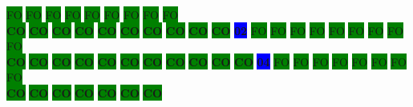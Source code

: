 \colorbox{green}{\color[gray]{0.75}FO}%
\colorbox{green}{\color[gray]{0.75}FO}%
\colorbox{green}{\color[gray]{0.75}FO}%
\colorbox{green}{\color[gray]{0.75}FO}%
\colorbox{green}{\color[gray]{0.75}FO}%
\colorbox{green}{\color[gray]{0.75}FO}%
\colorbox{green}{\color[gray]{0.75}FO}%
\colorbox{green}{\color[gray]{0.75}FO}%
\colorbox{green}{\color[gray]{0.75}FO}%
\\
\colorbox{green}{\color[rgb]{0,0,0}\textbf{CO}}%
\colorbox{green}{\color[rgb]{0,0,0}\textbf{CO}}%
\colorbox{green}{\color[rgb]{0,0,0}\textbf{CO}}%
\colorbox{green}{\color[rgb]{0,0,0}\textbf{CO}}%
\colorbox{green}{\color[rgb]{0,0,0}\textbf{CO}}%
\colorbox{green}{\color[rgb]{0,0,0}\textbf{CO}}%
\colorbox{green}{\color[rgb]{0,0,0}\textbf{CO}}%
\colorbox{green}{\color[rgb]{0,0,0}\textbf{CO}}%
\colorbox{green}{\color[rgb]{0,0,0}\textbf{CO}}%
\colorbox{green}{\color[rgb]{0,0,0}\textbf{CO}}%
\colorbox{blue}{\color[rgb]{1,0,0}\textbf{02}}%
\colorbox{green}{\color[gray]{0.75}FO}%
\colorbox{green}{\color[gray]{0.75}FO}%
\colorbox{green}{\color[gray]{0.75}FO}%
\colorbox{green}{\color[gray]{0.75}FO}%
\colorbox{green}{\color[gray]{0.75}FO}%
\colorbox{green}{\color[gray]{0.75}FO}%
\colorbox{green}{\color[gray]{0.75}FO}%
\colorbox{green}{\color[gray]{0.75}FO}%
\colorbox{green}{\color[gray]{0.75}FO}%
\\
\colorbox{green}{\color[rgb]{0,0,0}\textbf{CO}}%
\colorbox{green}{\color[rgb]{0,0,0}\textbf{CO}}%
\colorbox{green}{\color[rgb]{0,0,0}\textbf{CO}}%
\colorbox{green}{\color[rgb]{0,0,0}\textbf{CO}}%
\colorbox{green}{\color[rgb]{0,0,0}\textbf{CO}}%
\colorbox{green}{\color[rgb]{0,0,0}\textbf{CO}}%
\colorbox{green}{\color[rgb]{0,0,0}\textbf{CO}}%
\colorbox{green}{\color[rgb]{0,0,0}\textbf{CO}}%
\colorbox{green}{\color[rgb]{0,0,0}\textbf{CO}}%
\colorbox{green}{\color[rgb]{0,0,0}\textbf{CO}}%
\colorbox{green}{\color[rgb]{0,0,0}\textbf{CO}}%
\colorbox{blue}{\color[rgb]{1,0,0}\textbf{04}}%
\colorbox{green}{\color[gray]{0.75}FO}%
\colorbox{green}{\color[gray]{0.75}FO}%
\colorbox{green}{\color[gray]{0.75}FO}%
\colorbox{green}{\color[gray]{0.75}FO}%
\colorbox{green}{\color[gray]{0.75}FO}%
\colorbox{green}{\color[gray]{0.75}FO}%
\colorbox{green}{\color[gray]{0.75}FO}%
\colorbox{green}{\color[gray]{0.75}FO}%
\\
\colorbox{green}{\color[rgb]{0,0,0}\textbf{CO}}%
\colorbox{green}{\color[rgb]{0,0,0}\textbf{CO}}%
\colorbox{green}{\color[rgb]{0,0,0}\textbf{CO}}%
\colorbox{green}{\color[rgb]{0,0,0}\textbf{CO}}%
\colorbox{green}{\color[rgb]{0,0,0}\textbf{CO}}%
\colorbox{green}{\color[rgb]{0,0,0}\textbf{CO}}%
\colorbox{green}{\color[rgb]{0,0,0}\textbf{CO}}%
